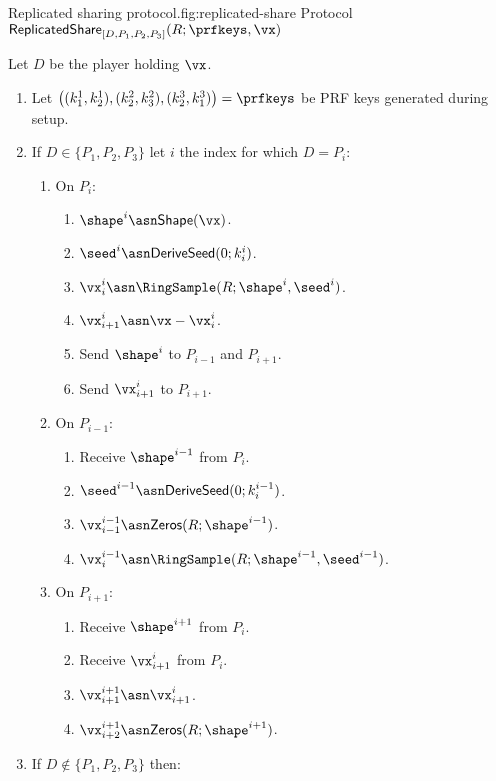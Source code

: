 
\begin{Boxfig}{Replicated sharing protocol.}{fig:replicated-share}
  {Protocol $\mathsf{ReplicatedShare}_{[D, P_1, P_2, P_3]}(R; \prfkeys, \vx)$}

  Let $D$ be the player holding $\vx$.

  \begin{enumerate}
  \item Let $\left( (k_1^1, k_2^1), (k_2^2, k_3^2), (k_2^3, k_1^3) \right) = \prfkeys$ be PRF keys generated during setup.
  \item If $D \in \{P_1, P_2, P_3\}$ let $i$ the index for which $D = P_i$:

    \begin{enumerate}
    \item On $P_i$:
      \begin{enumerate}
        \item $\shape^i \asn \mathsf{Shape}(\vx)$.
        \item ${\seed}^i \asn \mathsf{DeriveSeed}(0; k^i_i)$.
        \item $\vx_i^i \asn \RingSample(R; \shape^i, \seed^i)$.
        \item $\vx_{i+1}^i \asn \vx - \vx_i^i$.
        \item Send $\shape^i$ to $P_{i-1}$ and $P_{i+1}$.
        \item Send $\vx_{i+1}^i$ to $P_{i+1}$.
      \end{enumerate}

    \item On $P_{i-1}$:
      \begin{enumerate}
        \item Receive $\shape^{i-1}$ from $P_i$.
        \item ${\seed}^{i-1} \asn \mathsf{DeriveSeed}(0; k^{i-1}_i)$.
        \item $\vx_{i-1}^{i-1} \asn \mathsf{Zeros}(R; \shape^{i-1})$.
        \item $\vx_i^{i-1} \asn \RingSample(R; \shape^{i-1}, \seed^{i-1})$.
      \end{enumerate}

    \item On $P_{i+1}$:
      \begin{enumerate}
        \item Receive $\shape^{i+1}$ from $P_i$.
        \item Receive $\vx_{i+1}^i$ from $P_i$.
        \item $\vx_{i+1}^{i+1} \asn \vx_{i+1}^i$.
        \item $\vx_{i+2}^{i+1} \asn \mathsf{Zeros}(R; \shape^{i+1})$.
      \end{enumerate}
    \end{enumerate}
  \item If $D \notin \{P_1, P_2, P_3\}$ then:


\end{enumerate}
\end{Boxfig}
